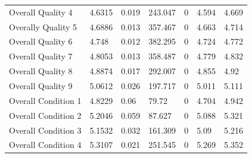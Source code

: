 \documentclass{article}
\begin{document}
\begin{table}[]
\begin{tabular}{lllllll}
		Overall Quality 4                & 4.6315                    & 0.019                        & 243.047                & 0                                       & 4.594                         & 4.669                         \\
		Overally Quality 5               & 4.6886                    & 0.013                        & 357.467                & 0                                       & 4.663                         & 4.714                         \\
		Overall Quality 6                & 4.748                     & 0.012                        & 382.295                & 0                                       & 4.724                         & 4.772                         \\
		Overall Quality 7                & 4.8053                    & 0.013                        & 358.487                & 0                                       & 4.779                         & 4.832                         \\
		Overall Quality 8                & 4.8874                    & 0.017                        & 292.007                & 0                                       & 4.855                         & 4.92                          \\
		Overall Quality 9                & 5.0612                    & 0.026                        & 197.717                & 0                                       & 5.011                         & 5.111                         \\
		Overall Condition 1              & 4.8229                    & 0.06                         & 79.72                  & 0                                       & 4.704                         & 4.942                         \\
		Overall Condition 2              & 5.2046                    & 0.059                        & 87.627                 & 0                                       & 5.088                         & 5.321                         \\
		Overall Condition 3              & 5.1532                    & 0.032                        & 161.309                & 0                                       & 5.09                          & 5.216                         \\
		Overall Condition 4              & 5.3107                    & 0.021                        & 251.545                & 0                                       & 5.269                         & 5.352                         \\

\end{tabular}
\end{table}
\end{document}
